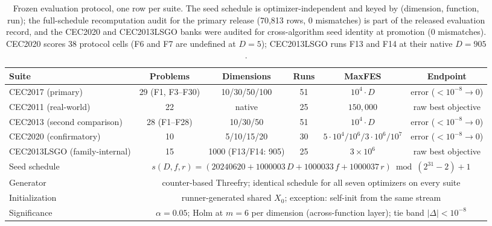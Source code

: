\begin{table}[H]
\caption{Frozen evaluation protocol, one row per suite. The seed schedule is
optimizer-independent
and keyed by (dimension, function, run); the full-schedule
recomputation audit for the primary release (70{,}813 rows, 0 mismatches) is
part of the
released evaluation record, and the CEC2020 and CEC2013LSGO banks were
audited for cross-algorithm seed identity at promotion (0 mismatches).
CEC2020 scores 38 protocol cells (F6 and F7 are undefined at $D = 5$);
CEC2013LSGO runs F13 and F14 at their native $D = 905$.}\label{tab:protocol}
\centering
\tablesize{\scriptsize}
\setlength{\tabcolsep}{4pt}%
\begin{tabular}{lccccc}
\toprule
\textbf{Suite} & \textbf{Problems} & \textbf{Dimensions} & \textbf{Runs} & \textbf{MaxFES} & \textbf{Endpoint} \\
\midrule
CEC2017 (primary) & 29 (F1, F3--F30) & 10/30/50/100 & 51 & $10^{4}\cdot D$ & error ($<10^{-8}\!\to\!0$) \\
CEC2011 (real-world) & 22 & native & 25 & $150{,}000$ & raw best objective \\
CEC2013 (second comparison) & 28 (F1--F28) & 10/30/50 & 51 & $10^{4}\cdot D$ & error ($<10^{-8}\!\to\!0$) \\
CEC2020 (confirmatory) & 10 & 5/10/15/20 & 30 & $5{\cdot}10^{4}/10^{6}/3{\cdot}10^{6}/10^{7}$ & error ($<10^{-8}\!\to\!0$) \\
CEC2013LSGO (family-internal) & 15 & 1000 (F13/F14: 905) & 25 & $3\times10^{6}$ & raw best objective \\
\midrule
Seed schedule & \multicolumn{5}{c}{$s(D,f,r) = (20240620 + 1000003\,D + 1000033\,f + 1000037\,r) \bmod (2^{31}{-}2) + 1$} \\
Generator & \multicolumn{5}{c}{counter-based Threefry; identical schedule for all seven optimizers on every suite} \\
Initialization & \multicolumn{5}{c}{runner-generated shared $X_{0}$; exception: \dtgsk{} self-init from the same stream} \\
Significance & \multicolumn{5}{c}{$\alpha = 0.05$; Holm at $m{=}6$ per dimension (across-function layer); tie band $|\Delta| < 10^{-8}$} \\
\bottomrule
\end{tabular}
\end{table}

